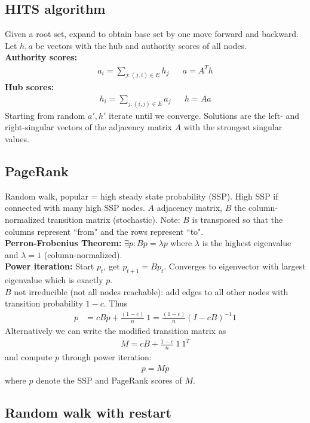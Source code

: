 \subsection*{HITS algorithm}
Given a root set, expand to obtain base set by one move forward and backward. Let $h, a$ be vectors with the hub and authority scores of all nodes.\\
\textbf{Authority scores:}
\begin{align*}
    a_i = \sum_{j: (j,i) \in E} h_j && a = A^T h
\end{align*}
\textbf{Hub scores:}
\begin{align*}
    h_i = \sum_{j: (i,j) \in E} a_j && h = A a
\end{align*}
Starting from random $a',h'$ iterate until we converge. Solutions are the left- and right-singular vectors of the adjacency matrix $A$ with the strongest singular values.

\subsection*{PageRank}
Random walk, popular = high steady state probability (SSP). High SSP if connected with many high SSP nodes. $A$ adjacency matrix, $B$ the column-normalized transition matrix (stochastic). Note: $B$ is transposed so that the columns represent ``from" and the rows represent ``to".\\
\textbf{Perron-Frobenius Theorem:} $\exists p: Bp = \lambda p$ where $\lambda$ is the highest eigenvalue and $\lambda = 1$ (column-normalized).\\
\textbf{Power iteration:} Start $p_t$, get $p_{t+1} = B p_t$. Converges to eigenvector with largest eigenvalue which is exactly $p$.\\
$B$ not irreducible (not all nodes reachable): add edges to all other nodes with transition probability $1-c$. Thus
\begin{align*}
    p &= cBp + \frac{(1-c)}{n} \ 1 = \frac{(1-c)}{n} \left( I - cB \right)^{-1} 1
\end{align*}
Alternatively we can write the modified transition matrix as
\begin{align*}
    M = cB + \frac{1-c}{n} \ 1 \ 1^T
\end{align*}
and compute $p$ through power iteration:
\begin{align*}
    p = Mp
\end{align*}
where $p$ denote the SSP and PageRank scores of $M$.

\subsection*{Random walk with restart}

